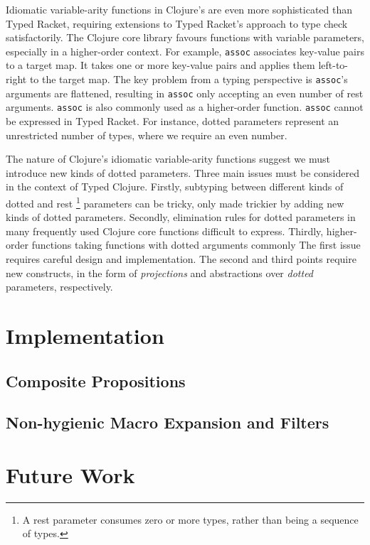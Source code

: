 \documentclass{cshonours}
\begin{document}
Idiomatic variable-arity functions in Clojure's are even more sophisticated than Typed Racket, requiring extensions
to Typed Racket's approach to type check satisfactorily. The Clojure core library favours functions with
variable parameters, especially in a higher-order context. For example, \lstinline|assoc|
associates key-value pairs to a target map. It takes one or more key-value pairs and
applies them left-to-right to the target map. The key problem from a typing perspective
is \lstinline|assoc|'s arguments are flattened, resulting in \lstinline|assoc| only
accepting an even number of rest arguments. \lstinline|assoc| is also commonly used as a
higher-order function.
\lstinline|assoc| cannot be expressed in Typed Racket. For instance,
dotted parameters represent an unrestricted number of types, where we require an even number.

The nature of Clojure's idiomatic variable-arity functions suggest we must introduce
new kinds of dotted parameters. Three main issues must be considered in the context of Typed Clojure.
Firstly, subtyping between different kinds of dotted and rest
\footnote{A rest parameter consumes zero or more types, rather than being a sequence of types.}
parameters can be tricky, only made trickier by adding new kinds of dotted parameters.
Secondly, elimination rules for dotted parameters in many frequently used Clojure core functions
difficult to express.
Thirdly, higher-order functions taking functions with dotted arguments commonly 
The first issue requires careful design and implementation.
The second and third points require new constructs, in the form of \emph{projections}
and abstractions over \emph{dotted} parameters, respectively.



\section{Implementation}

\subsection{Composite Propositions}

\subsection{Non-hygienic Macro Expansion and Filters}

\section{Future Work}
\end{document}
